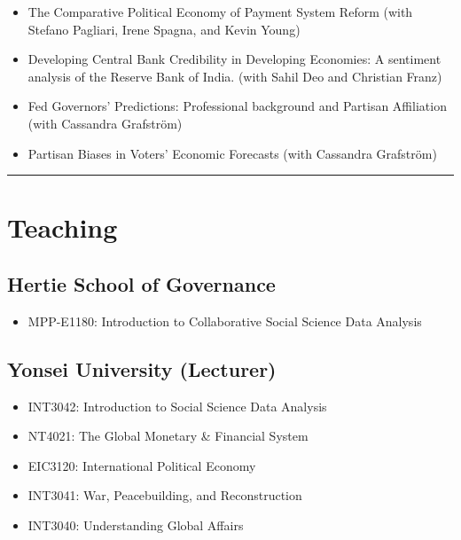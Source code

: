 \documentclass[a4paper]{article}
\begin{document}
{\begin{itemize}
    \item The Comparative Political Economy of Payment System Reform (with Stefano Pagliari, Irene Spagna, and Kevin Young)

    \item Developing Central Bank Credibility in Developing Economies: A sentiment
    analysis of the Reserve Bank of India. (with Sahil Deo and Christian Franz)

    \item Fed Governors' Predictions: Professional background and Partisan Affiliation (with Cassandra Grafstr\"{o}m)

    \item Partisan Biases in Voters' Economic Forecasts (with Cassandra Grafstr\"{o}m)

\end{itemize}


\vspace{0.25cm}
\medskip\hrule height 1pt
\vspace{0.5cm}

\section*{Teaching}

\subsection*{Hertie School of Governance}

\begin{itemize}

    \item MPP-E1180: Introduction to Collaborative Social Science Data Analysis

\end{itemize}

\subsection*{Yonsei University (Lecturer)}

\begin{itemize}

    \item INT3042: Introduction to Social Science Data Analysis
    \item NT4021: The Global Monetary \& Financial System
    \item EIC3120: International Political Economy
    \item INT3041: War, Peacebuilding, and Reconstruction
    \item INT3040: Understanding Global Affairs


\end{itemize}}
\end{document}

